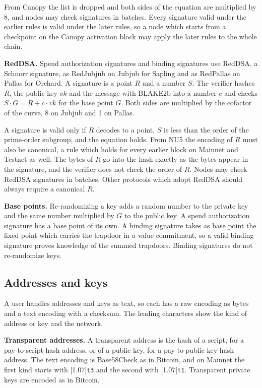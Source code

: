 \documentclass{article}
\let\oldtexttt\texttt
\renewcommand{\texttt}[1]{\scalebox{0.97}[1.07]{\oldtexttt{#1}}}
\newcommand{\lsubsection}[2]{\def\sectionlabel{#2} \subsection{#1}\label{#2}}
\theoremstyle{labelledtheorem} %
\begin{document}
From Canopy the list is dropped and both sides of the equation are multiplied by 8, and nodes may check signatures in batches. Every signature valid under the earlier rules is valid under the later rules, so a node which starts from a checkpoint on the Canopy activation block may apply the later rules to the whole chain.

\textbf{RedDSA.} Spend authorization signatures and binding signatures use RedDSA, a Schnorr signature, as RedJubjub on Jubjub for Sapling and as RedPallas on Pallas for Orchard. A signature is a point $R$ and a number $S$. The verifier hashes $R$, the public key $\mathit{vk}$ and the message with BLAKE2b into a number $c$ and checks $S \cdot G = R + c \cdot \mathit{vk}$ for the base point $G$. Both sides are multiplied by the cofactor of the curve, 8 on Jubjub and 1 on Pallas.

A signature is valid only if $R$ decodes to a point, $S$ is less than the order of the prime-order subgroup, and the equation holds. From NU5 the encoding of $R$ must also be canonical, a rule which holds for every earlier block on Mainnet and Testnet as well. The bytes of $R$ go into the hash exactly as the bytes appear in the signature, and the verifier does not check the order of $R$. Nodes may check RedDSA signatures in batches. Other protocols which adopt RedDSA should always require a canonical $R$.

\textbf{Base points.} Re-randomizing a key adds a random number to the private key and the same number multiplied by $G$ to the public key. A spend authorization signature has a base point of its own. A binding signature takes as base point the fixed point which carries the trapdoor in a value commitment, so a valid binding signature proves knowledge of the summed trapdoors. Binding signatures do not re-randomize keys.

\lsubsection{Addresses and keys}{readableaddresses}

A user handles addresses and keys as text, so each has a raw encoding as bytes and a text encoding with a checksum. The leading characters show the kind of address or key and the network.

\textbf{Transparent addresses.} A transparent address is the hash of a script, for a pay-to-script-hash address, or of a public key, for a pay-to-public-key-hash address. The text encoding is Base58Check as in Bitcoin, and on Mainnet the first kind starts with \texttt{t3} and the second with \texttt{t1}. Transparent private keys are encoded as in Bitcoin.
\end{document}
